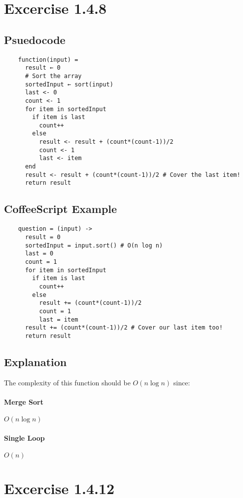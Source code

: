 \documentclass[12pt]{article}
\begin{document}
\maketitle

\section{Excercise 1.4.8}
\subsection{Psuedocode}
\begin{verbatim} 
	function(input) =
	  result ← 0
	  # Sort the array
	  sortedInput ← sort(input)
	  last <- 0
	  count <- 1 
	  for item in sortedInput
	    if item is last
	      count++
	    else
	      result <- result + (count*(count-1))/2
	      count <- 1
	      last <- item
	  end
	  result <- result + (count*(count-1))/2 # Cover the last item!
	  return result
\end{verbatim}

\clearpage
\subsection{CoffeeScript Example}
\begin{verbatim}
	question = (input) ->
	  result = 0
	  sortedInput = input.sort() # O(n log n)
	  last = 0
	  count = 1
	  for item in sortedInput
	    if item is last
	      count++
	    else
	      result += (count*(count-1))/2
	      count = 1
	      last = item
	  result += (count*(count-1))/2 # Cover our last item too!
	  return result
\end{verbatim}

\subsection{Explanation}
The complexity of this function should be $ O(n \log n ) $ since:
\paragraph{Merge Sort} $ O(n \log n)$
\paragraph{Single Loop} $ O(n) $

\section{Excercise 1.4.12}
\end{document}
